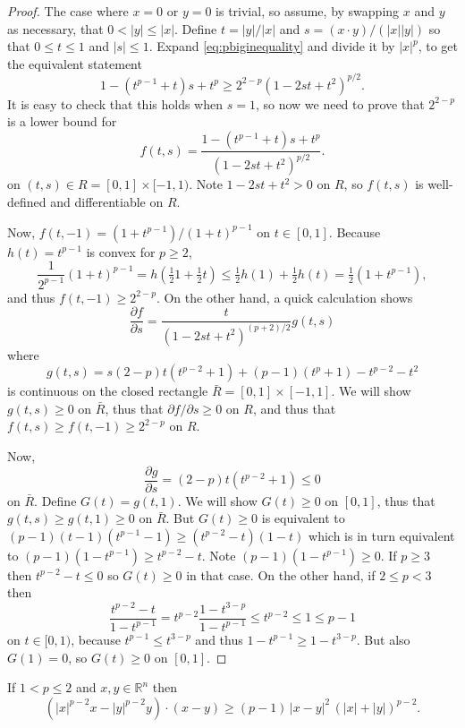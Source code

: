 \documentclass[final,onefignum]{siamart190516}
\newcommand\RR{\mathbb{R}}
\begin{document}
\begin{proof}  The case where $x=0$ or $y=0$ is trivial, so assume, by swapping $x$ and $y$ as necessary, that $0 < |y| \le |x|$.  Define $t=|y|/|x|$ and $s = (x\cdot y)/(|x||y|)$ so that $0\le t \le 1$ and $|s|\le 1$.  Expand \eqref{eq:pbiginequality} and divide it by $|x|^p$, to get the equivalent statement
    $$1 - (t^{p-1}+t) s + t^p \ge 2^{2-p} \left(1 - 2 s t + t^2\right)^{p/2}.$$
It is easy to check that this holds when $s=1$, so now we need to prove that $2^{2-p}$ is a lower bound for
	$$f(t,s) = \frac{1 - (t^{p-1}+t) s + t^p}{\left(1 - 2 s t + t^2\right)^{p/2}}.$$
on $(t,s) \in R=[0,1]\times[-1,1)$.  Note $1-2st+t^2 > 0$ on $ R$, so $f(t,s)$ is well-defined and differentiable on $R$.

Now, $f(t,-1) = \left(1 + t^{p-1}\right) / \left(1 + t\right)^{p-1}$ on $t\in[0,1]$.  Because $h(t)=t^{p-1}$ is convex for $p \ge 2$,
    $$\frac{1}{2^{p-1}} (1+t)^{p-1} = h(\tfrac{1}{2} 1 + \tfrac{1}{2} t) \le \tfrac{1}{2} h(1) + \tfrac{1}{2} h(t) = \tfrac{1}{2} (1 + t^{p-1}),$$
and thus $f(t,-1) \ge 2^{2-p}$.  On the other hand, a quick calculation shows
    $$\frac{\partial f}{\partial s} = \frac{t}{\left(1 - 2 s t + t^2\right)^{(p+2)/2}} g(t,s)$$
where
    $$g(t,s) = s(2-p) t (t^{p-2} + 1) + (p-1) (t^p+1) - t^{p-2} - t^2$$
is continuous on the closed rectangle $\bar R = [0,1]\times[-1,1]$.  We will show $g(t,s)\ge 0$ on $\bar R$, thus that $\partial f/\partial s \ge 0$ on $R$, and thus that $f(t,s)\ge f(t,-1) \ge  2^{2-p}$ on $R$.

Now,
    $$\frac{\partial g}{\partial s} = (2-p) t (t^{p-2} + 1) \le 0$$
on $\bar R$.  Define $G(t) = g(t,1)$.  We will show $G(t)\ge 0$ on $[0,1]$, thus that $g(t,s)\ge g(t,1)\ge 0$ on $\bar R$.  But $G(t)\ge 0$ is equivalent to $(p-1) (t-1) (t^{p-1}-1) \ge (t^{p-2} - t) (1 - t)$ which is in turn equivalent to $(p-1) (1 - t^{p-1}) \ge t^{p-2} - t$.  Note $(p-1) (1 - t^{p-1}) \ge 0$.  If $p\ge 3$ then $t^{p-2} - t \le 0$ so $G(t)\ge 0$ in that case.  On the other hand, if $2\le p < 3$ then
	$$\frac{t^{p-2} - t}{1 - t^{p-1}} = t^{p-2} \frac{1 - t^{3-p}}{1 - t^{p-1}} \le t^{p-2} \le 1 \le p-1$$
on $t\in[0,1)$, because $t^{p-1}\le t^{3-p}$ and thus $1 - t^{p-1} \ge 1 - t^{3-p}$.  But also $G(1)=0$, so $G(t)\ge 0$ on $[0,1]$. \end{proof}

\begin{lemma}  \label{lem:psmallinequality}  If $1<p\le 2$ and $x,y\in\RR^n$ then
\begin{equation}
\left(|x|^{p-2} x - |y|^{p-2} y\right)\cdot(x-y) \ge (p-1)\, |x-y|^2 \, \left(|x|+|y|\right)^{p-2}. \label{eq:psmallinequality}
\end{equation}
\end{lemma}
\end{document}

